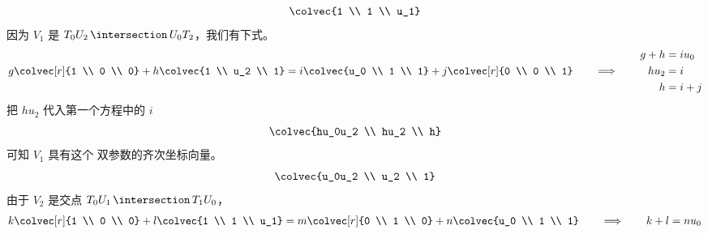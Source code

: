 \begin{exercises}
\begin{answer}
\begin{exparts}
          \begin{equation*}
            \colvec{1 \\ 1 \\ u_1}
          \end{equation*}
        \partsitem
          因为 $V_1$ 是 $T_0U_2\,\intersection\,U_0T_2$，我们有下式。
          \begin{equation*}
            g\colvec[r]{1 \\ 0 \\ 0}+h\colvec{1 \\ u_2 \\ 1}
            =i\colvec{u_0 \\ 1 \\ 1}+j\colvec[r]{0 \\ 0 \\ 1}
            \qquad\Longrightarrow\qquad
            \begin{aligned}
              g+h  &= iu_0 \\
              hu_2 &= i    \\
              h    &= i+j
            \end{aligned}
          \end{equation*}
          把 $hu_2$ 代入第一个方程中的 $i$
          \begin{equation*}
            \colvec{hu_0u_2 \\ hu_2 \\ h}
          \end{equation*}
          可知 $V_1$ 具有这个
          双参数的齐次坐标向量。
          \begin{equation*}
            \colvec{u_0u_2 \\ u_2 \\ 1}
          \end{equation*}
        \partsitem
           由于 $V_2$ 是交点
           $T_0U_1\,\intersection\,T_1U_0$，
           \begin{equation*}
             k\colvec[r]{1 \\ 0 \\ 0}+l\colvec{1 \\ 1 \\ u_1}
              =m\colvec[r]{0 \\ 1 \\ 0}+n\colvec{u_0 \\ 1 \\ 1}
             \qquad\Longrightarrow\qquad
             \begin{aligned}
               k+l  &= nu_0 \\

\end{aligned}
\end{equation*}
\end{exparts}
\end{answer}
\end{exercises}
